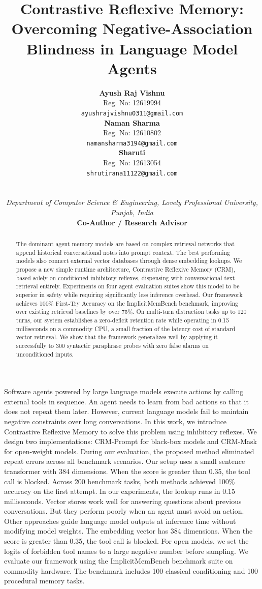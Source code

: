\documentclass[10pt,conference]{IEEEtran}
\title{Contrastive Reflexive Memory: Overcoming Negative-Association Blindness in Language Model Agents}
\author{
\begin{minipage}{0.32\textwidth}
\centering
{\normalsize \textbf{Ayush Raj Vishnu}}\\[0.2ex]
{\small Reg. No: 12619994}\\[0.1ex]
{\footnotesize \texttt{ayushrajvishnu0311@gmail.com}}
\end{minipage}\hfill
\begin{minipage}{0.32\textwidth}
\centering
{\normalsize \textbf{Naman Sharma}}\\[0.2ex]
{\small Reg. No: 12610802}\\[0.1ex]
{\footnotesize \texttt{namansharma3194@gmail.com}}
\end{minipage}\hfill
\begin{minipage}{0.32\textwidth}
\centering
{\normalsize \textbf{Sharuti}}\\[0.2ex]
{\small Reg. No: 12613054}\\[0.1ex]
{\footnotesize \texttt{shrutirana11122@gmail.com}}
\end{minipage}\\[1.2ex]
\begin{minipage}{\textwidth}
\centering
{\small \textit{Department of Computer Science \& Engineering, Lovely Professional University, Punjab, India}}\\[1.2ex]
{\normalsize \textbf{Co-Author / Research Advisor}}\quad{\footnotesize \texttt{advisor@lpu.co.in}}
\end{minipage}
}
\begin{document}
\maketitle

\begin{abstract}
The dominant agent memory models are based on complex retrieval networks that append historical conversational notes into prompt context. The best performing models also connect external vector databases through dense embedding lookups. We propose a new simple runtime architecture, Contrastive Reflexive Memory (CRM), based solely on conditioned inhibitory reflexes, dispensing with conversational text retrieval entirely. Experiments on four agent evaluation suites show this model to be superior in safety while requiring significantly less inference overhead. Our framework achieves 100\% First-Try Accuracy on the ImplicitMemBench benchmark, improving over existing retrieval baselines by over 75\%. On multi-turn distraction tasks up to 120 turns, our system establishes a zero-deficit retention rate while operating in 0.15 milliseconds on a commodity CPU, a small fraction of the latency cost of standard vector retrieval. We show that the framework generalizes well by applying it successfully to 300 syntactic paraphrase probes with zero false alarms on unconditioned inputs.
\end{abstract}

Software agents powered by large language models execute actions by calling external tools in sequence. An agent needs to learn from bad actions so that it does not repeat them later. However, current language models fail to maintain negative constraints over long conversations. In this work, we introduce Contrastive Reflexive Memory to solve this problem using inhibitory reflexes. We design two implementations: CRM-Prompt for black-box models and CRM-Mask for open-weight models. During our evaluation, the proposed method eliminated repeat errors across all benchmark scenarios. Our setup uses a small sentence transformer with 384 dimensions. When the score is greater than 0.35, the tool call is blocked. Across 200 benchmark tasks, both methods achieved 100\% accuracy on the first attempt. In our experiments, the lookup runs in 0.15 milliseconds. Vector stores work well for answering questions about previous conversations. But they perform poorly when an agent must avoid an action. Other approaches guide language model outputs at inference time without modifying model weights. The embedding vector has 384 dimensions. When the score is greater than 0.35, the tool call is blocked. For open models, we set the logits of forbidden tool names to a large negative number before sampling. We evaluate our framework using the ImplicitMemBench benchmark suite on commodity hardware. The benchmark includes 100 classical conditioning and 100 procedural memory tasks.
\end{document}
